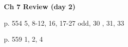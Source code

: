 \documentclass{report}
\theoremstyle{definition}
\begin{document}
\begin{enumerate}
\vspace{-2cm}	
\begin{minipage}[t]{0.45\linewidth}
\hspace{-2cm}\noindent \textbf{Ch 7 Review (day 2)}\\ \normalsize
\vspace{-0.35cm}

\hspace{-2cm}\noindent p. 554 5, 8-12, 16, 17-27 odd, 30 , 31, 33\\
\vspace{-0.35cm}

\hspace{-2cm}\noindent p. 559 1, 2, 4

\end{minipage}
\begin{minipage}[t]{0.45\linewidth}
\hfill
\end{minipage}

 \newpage





\end{enumerate}
\end{document}
